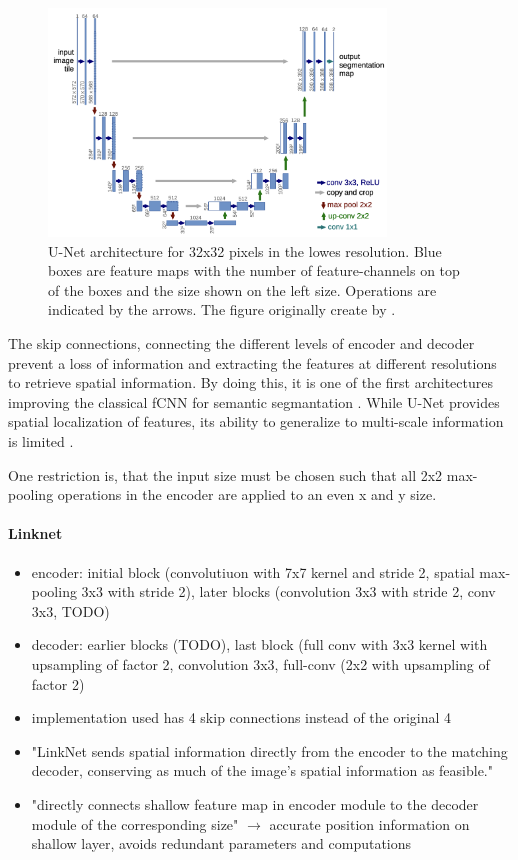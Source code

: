 \begin{figure}[htb!]
	\centering
	\includegraphics[width=0.8\textwidth]{fig/unet-architecture.png}
	\caption{U-Net architecture for 32x32 pixels in the lowes resolution. Blue boxes are feature maps with the number of feature-channels on top of the boxes and the size shown on the left size. Operations are indicated by the arrows. The figure originally create by \citeauthor{unet} \cite{unet}.}
	\label{fig:unet-architecture}
\end{figure}

The skip connections, connecting the different levels of encoder and decoder prevent a loss of information and extracting the features at different resolutions to retrieve spatial information. By doing this, it is one of the first architectures improving the classical fCNN for semantic segmantation \cite{Litjens2017}. While U-Net provides spatial localization of features, its ability to generalize to multi-scale information is limited \cite{Norelyaqine2023}.

One restriction is, that the input size must be chosen such that all 2x2 max-pooling operations in the encoder are applied to an even x and y size.


\paragraph{Linknet}

\begin{itemize}
	\item encoder: initial block (convolutiuon with 7x7 kernel and stride 2, spatial max-pooling 3x3 with stride 2), later blocks (convolution 3x3 with stride 2, conv 3x3, TODO) \cite{linknet}
	\item decoder: earlier blocks (TODO), last block (full conv with 3x3 kernel with upsampling of factor 2, convolution 3x3, full-conv (2x2 with upsampling of factor 2)
	\item implementation used has 4 skip connections instead of the original 4 \cite{SegmentationModels}
	\item "LinkNet sends spatial information directly from the encoder to the matching decoder, conserving as much of the image’s spatial information as feasible."
	\item "directly connects shallow feature map in encoder module to the decoder module of the corresponding size" $\rightarrow$ accurate position information on shallow layer, avoids redundant parameters and computations \cite{Norelyaqine2023}
\end{itemize}

